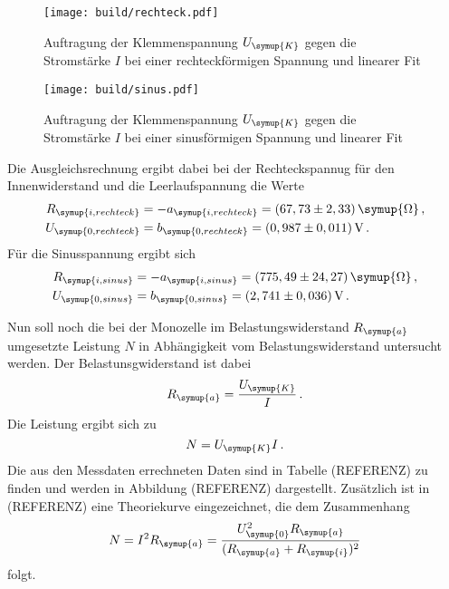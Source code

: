 \begin{figure}
  \centering
  \texttt{[image: build/rechteck.pdf]}
  \caption{Auftragung der Klemmenspannung $U_{\symup{K}}$ gegen die Stromstärke $I$
  bei einer rechteckförmigen Spannung und linearer Fit}
  \label{fig:rechteck}
\end{figure}

\begin{figure}
  \centering
  \texttt{[image: build/sinus.pdf]}
  \caption{Auftragung der Klemmenspannung $U_{\symup{K}}$ gegen die Stromstärke $I$
  bei einer sinusförmigen Spannung und linearer Fit}
  \label{fig:sinus}
\end{figure}

Die Ausgleichsrechnung ergibt dabei bei der Rechteckspannug für den Innenwiderstand
und die Leerlaufspannung die Werte
\begin{align}
  R_{\symup{i,rechteck}}&=-a_{\symup{i,rechteck}}=(67,73\pm2,33)\,\symup{\Omega} \,, \\
  U_{\symup{0,rechteck}}&=b_{\symup{0,rechteck}}=(0,987\pm0,011)\,\text{V}\,.
\end{align}
Für die Sinusspannung ergibt sich
\begin{align}
  R_{\symup{i,sinus}}&=-a_{\symup{i,sinus}}=(775,49\pm24,27)\,\symup{\Omega} \,, \\
  U_{\symup{0,sinus}}&=b_{\symup{0,sinus}}=(2,741\pm0,036)\,\text{V}\,.
\end{align}


Nun soll noch die bei der Monozelle im Belastungswiderstand $R_{\symup{a}}$ umgesetzte
Leistung $N$ in Abhängigkeit vom Belastungswiderstand untersucht werden.
Der Belastunsgwiderstand ist dabei
\begin{equation}
  R_{\symup{a}}=\frac{U_{\symup{K}}}{I}\,.
\end{equation}
Die Leistung ergibt sich zu
\begin{equation}
  N=U_{\symup{K}}I\,.
\end{equation}
Die aus den Messdaten errechneten Daten sind in Tabelle (REFERENZ) zu finden und
werden in Abbildung (REFERENZ) dargestellt. Zusätzlich ist in (REFERENZ) eine
Theoriekurve eingezeichnet, die dem Zusammenhang
\begin{equation}
  N=I^2 R_{\symup{a}} = \frac{U_{\symup{0}}^2 R_{\symup{a}}}{(R_{\symup{a}}+R_{\symup{i}})^2}
\end{equation}
folgt.

